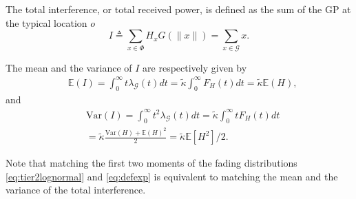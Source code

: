 \documentclass[lettersize,journal]{IEEEtran}
\begin{document}
The total interference, or total received power, is defined as the sum of the GP at the typical location $\textit{o}$ 
\begin{equation}
  \label{eq:totpow}
  I \triangleq \sum_{x \in \Phi} H_x G(\|x\|) = \sum_{x \in \mathcal{G}} x.
\end{equation}


The mean and the variance of $I$ are respectively given by
\begin{align}
  \label{eq:totmean}
  &\mathbb{E}\left(I \right) = \int_{0}^{\infty} t\lambda_{\mathcal{G}}(t) dt = \tilde{\kappa} \int_{0}^{\infty}F_H(t) dt =\tilde{\kappa} \mathbb{E}(H),
\end{align}
and
\begin{align}
  \label{eq:totvar}
  &\text{Var}\left(I \right) = \int_{0}^{\infty} t^2\lambda_{\mathcal{G}}(t) dt= \tilde{\kappa} \int_0^{\infty}tF_H(t) dt  \nonumber \\
  &= \tilde{\kappa} \frac{\text{Var}(H) + \mathbb{E}(H)^2}{2} = \tilde{\kappa}  \mathbb{E}[H^2]/2.
\end{align}

Note that matching the first two moments of the fading distributions \eqref{eq:tier2lognormal} and \eqref{eq:defexp} is equivalent to matching the mean and the variance of the total interference.
\end{document}
